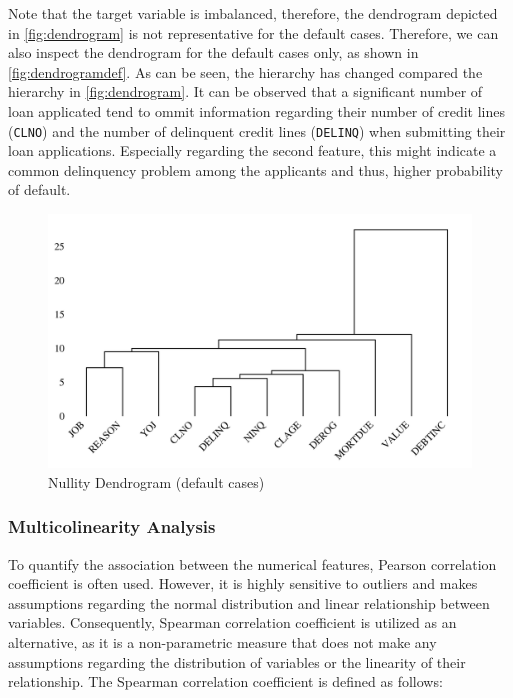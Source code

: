 Note that the target variable is imbalanced, therefore, the dendrogram depicted in \autoref{fig:dendrogram} is not representative for the default cases. Therefore, we can also inspect the dendrogram for the default cases only, as shown in \autoref{fig:dendrogramdef}.
As can be seen, the hierarchy has changed compared the hierarchy in \autoref{fig:dendrogram}. It can be observed that a significant number of loan applicated tend to ommit information regarding their number of credit lines (\texttt{CLNO}) and the number of delinquent credit lines (\texttt{DELINQ}) when submitting their loan applications. Especially regarding the second feature, this might indicate a common delinquency problem among the applicants and thus, higher probability of default.
\begin{figure}[H]
    \centering
    \caption{Nullity Dendrogram (default cases)}\vspace{0.5em}
    \label{fig:dendrogramdef}
    \includegraphics[width=140mm]{Figures/NA_Dendrogram_defaults.jpg}
    \vspace{-1em}
\end{figure}

\subsubsection{Multicolinearity Analysis}

To quantify the association between the numerical features, Pearson correlation coefficient is often used.
However, it is highly sensitive to outliers and makes assumptions regarding the normal distribution and linear relationship between variables.
Consequently, Spearman correlation coefficient is utilized as an alternative, as it is a non-parametric measure that does not make any assumptions regarding the distribution of variables or the linearity of their relationship.
The Spearman correlation coefficient is defined as follows:

